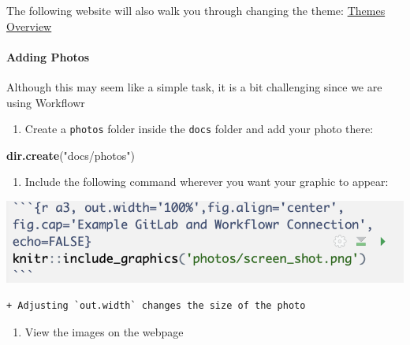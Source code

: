 \documentclass[openany]{article}
\newenvironment{Shaded}{\begin{snugshade}}{\end{snugshade}}
\newcommand{\KeywordTok}[1]{\textcolor[rgb]{0.13,0.29,0.53}{\textbf{#1}}}
\newcommand{\NormalTok}[1]{#1}
\newcommand{\StringTok}[1]{\textcolor[rgb]{0.31,0.60,0.02}{#1}}
\providecommand{\tightlist}{%
  \setlength{\itemsep}{0pt}\setlength{\parskip}{0pt}}
\let\oldparagraph\paragraph
\renewcommand{\paragraph}[1]{\oldparagraph{#1}\mbox{}}
\begin{document}
The following website will also walk you through changing the theme: \href{https://jdblischak.github.io/workflowr/articles/wflow-02-customization.html\#changing-the-theme}{Themes Overview}

\hypertarget{adding-photos}{%
\paragraph{Adding Photos}\label{adding-photos}}

Although this may seem like a simple task, it is a bit challenging since we are using Workflowr

\begin{enumerate}
\def\labelenumi{\arabic{enumi}.}
\tightlist
\item
  Create a \texttt{photos} folder inside the \texttt{docs} folder and add your photo there:
\end{enumerate}

\begin{Shaded}
\begin{Highlighting}[]
\KeywordTok{dir.create}\NormalTok{(}\StringTok{"docs/photos"}\NormalTok{)}
\end{Highlighting}
\end{Shaded}

\begin{enumerate}
\def\labelenumi{\arabic{enumi}.}
\setcounter{enumi}{1}
\tightlist
\item
  Include the following command wherever you want your graphic to appear:
\end{enumerate}

\begin{flushleft}\includegraphics[width=0.5\linewidth]{images/Workflow_Photos/photoExample} \end{flushleft}

\begin{verbatim}
+ Adjusting `out.width` changes the size of the photo
\end{verbatim}

\begin{enumerate}
\def\labelenumi{\arabic{enumi}.}
\setcounter{enumi}{2}
\tightlist
\item
  View the images on the webpage
\end{enumerate}
\end{document}
